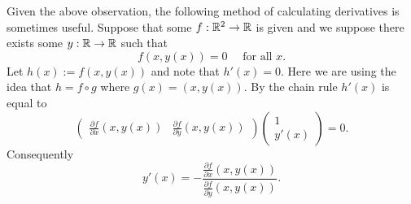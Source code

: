 Given the above observation, the following method of calculating derivatives is sometimes useful.
Suppose that some \(f:\mathbb{R}^2 \to \mathbb{R}\) is given and we suppose there exists some \(y:\mathbb{R}\to\mathbb{R}\) such that
\[
    f(x,y(x))=0 \quad \text{ for all \(x\)}.
\]
Let \(h(x):= f(x,y(x))\) and note that \(h'(x)=0\).
Here we are using the idea that \(h = f \circ g\) where \(g(x) = (x,y(x))\).
By the chain rule \( h'(x)\) is equal to
\[
    \begin{pmatrix}
        \frac{\partial f}{\partial x}(x,y(x)) & \frac{\partial f}{\partial y}(x,y(x))
    \end{pmatrix}
    \begin{pmatrix}
        1 \\
        y'(x)
    \end{pmatrix}
    =0.
\]
Consequently
\[
    y'(x) = - \frac{ \frac{\partial f}{\partial x}(x,y(x)) }{ \frac{\partial f}{\partial y}(x,y(x)) }.
\]



\bookletend

